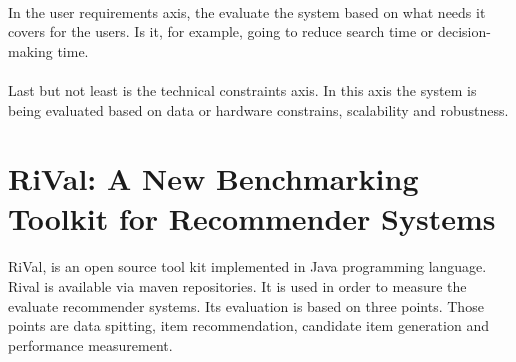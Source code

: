 \paragraph{}In the user requirements axis, the evaluate the system based on what needs it covers for the users. Is it, for example, going to reduce search time or decision-making time.

\paragraph{}Last but not least is the technical constraints axis. In this axis the system is being evaluated based on data or hardware constrains, scalability and robustness.

\section{RiVal: A New Benchmarking Toolkit for Recommender Systems \cite{said2014rival}}
\paragraph{}RiVal, is an open source tool kit implemented in Java programming language. Rival is available via maven repositories. It is used in order to measure the evaluate recommender systems. Its evaluation is based on three points. Those points are data spitting, item recommendation, candidate item generation and performance measurement. 
